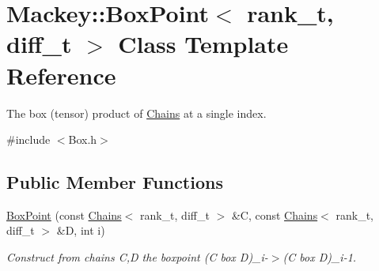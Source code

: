 \hypertarget{classMackey_1_1BoxPoint}{}\section{Mackey\+:\+:Box\+Point$<$ rank\+\_\+t, diff\+\_\+t $>$ Class Template Reference}
\label{classMackey_1_1BoxPoint}


The box (tensor) product of \hyperlink{classMackey_1_1Chains}{Chains} at a single index.  




{\ttfamily \#include $<$Box.\+h$>$}

\subsection*{Public Member Functions}
\begin{DoxyCompactItemize}
\item 
\hyperlink{classMackey_1_1BoxPoint_a7d7864d6623adb228897cb2d42594900}{Box\+Point} (const \hyperlink{classMackey_1_1Chains}{Chains}$<$ rank\+\_\+t, diff\+\_\+t $>$ \&C, const \hyperlink{classMackey_1_1Chains}{Chains}$<$ rank\+\_\+t, diff\+\_\+t $>$ \&D, int i)
\begin{DoxyCompactList}\small\item\em Construct from chains C,D the boxpoint (C box D)\+\_\+i-\/$>$(C box D)\+\_\+i-\/1. \end{DoxyCompactList}\end{DoxyCompactItemize}
